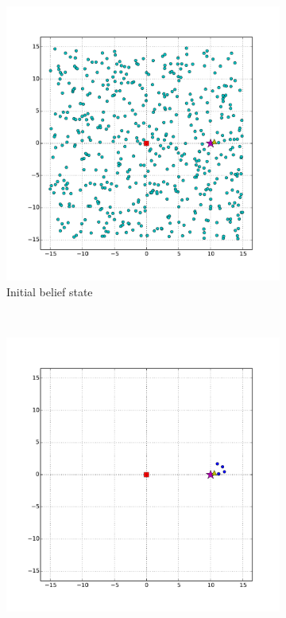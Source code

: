 
\begin{figure}
	    \centering
	    \begin{subfigure}[b]{0.3\textwidth}
	            \includegraphics[width=\textwidth]{high_vel_noise_initial}
	            \caption{Initial belief state}
	            \label{fig:high_vel_noise_init}
	    \end{subfigure}%
	    ~ %
	    \begin{subfigure}[b]{0.3\textwidth}
	            \includegraphics[width=\textwidth]{high_vel_noise_first_obs}

\end{subfigure}
\end{figure}
